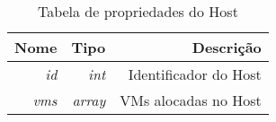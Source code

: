 \begin{table}[!htb]
    \centering
    \caption[Representação do Host]{Tabela de propriedades do Host
    \label{tab:constraint-shape}}
    \begin{tabular}{rrr}
        \toprule
            Nome & Tipo & Descrição \\ 
        \midrule
            \textit{id} & \textit{int} & Identificador do Host \\
            \textit{vms} & \textit{array} & VMs alocadas no Host \\
        \bottomrule
    \end{tabular}
\end{table}


